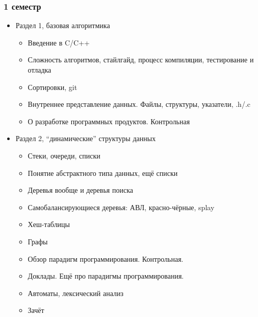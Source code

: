 \documentclass[xetex,mathserif,serif]{beamer}
\begin{document}
    \begin{frame}
        \frametitle{1 семестр}
        \begin{scriptsize}
            \begin{itemize}
                \item Раздел 1, базовая алгоритмика
                \begin{itemize}
                    \item \scriptsize{Введение в C/C++}
                    \item Сложность алгоритмов, стайлгайд, процесс компиляции, тестирование и отладка
                    \item Сортировки, git
                    \item Внутреннее представление данных. Файлы, структуры, указатели, .h/.c
                    \item О разработке программных продуктов. Контрольная
                \end{itemize}
                \item Раздел 2, ``динамические'' структуры данных
                \begin{scriptsize}
                    \begin{itemize}
                        \item \scriptsize{Стеки, очереди, списки}
                        \item Понятие абстрактного типа данных, ещё списки
                        \item Деревья вообще и деревья поиска
                        \item Самобалансирующиеся деревья: АВЛ, красно-чёрные, splay
                        \item Хеш-таблицы
                        \item Графы
                        \item Обзор парадигм программирования. Контрольная.
                        \item Доклады. Ещё про парадигмы программирования.
                        \item Автоматы, лексический анализ
                        \item Зачёт
                    \end{itemize}
                \end{scriptsize}
            \end{itemize}
        \end{scriptsize}
    \end{frame}
\end{document}
